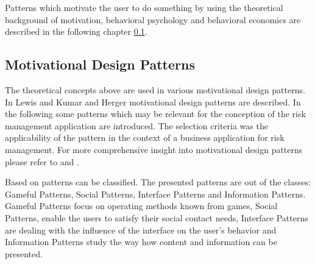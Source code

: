 Patterns which motivate the user to do something by using the theoretical background of motivation, behavioral psychology and behavioral economics are described in the following chapter \ref{sec:theoryBc}.


\newpage

\subsection{Motivational Design Patterns}
\label{sec:theoryBc}

The theoretical concepts above are used in various motivational design patterns. In Lewis \cite{lewisIrresistibleAppsMotivational2014} and Kumar and Herger \cite{kumarGamificationWorkDesigning2013} motivational design patterns are described. In the following some patterns which may be relevant for the conception of the risk management application are introduced. The selection criteria was the applicability of the pattern in the context of a business application for risk management. For more comprehensive insight into motivational design patterns please refer to \cite{lewisIrresistibleAppsMotivational2014} and \cite{kumarGamificationWorkDesigning2013}.

Based on \cite{lewisIrresistibleAppsMotivational2014} patterns can be classified. The presented patterns are out of the classes: Gameful Patterns, Social Patterns, Interface Patterns and Information Patterns. Gameful Patterns focus on operating methods known from games, Social Patterns, enable the users to satisfy their social contact needs, Interface Patterns are dealing with the influence of the interface on the user's behavior and Information Patterns study the way how content and information can be presented. \cite[p. 4, 5, 6]{lewisIrresistibleAppsMotivational2014}

